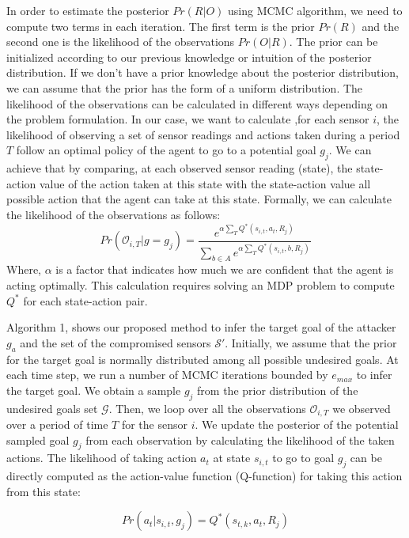 \documentclass[conference]{IEEEtran}
\begin{document}
In order to estimate the posterior $Pr(R|O)$ using  MCMC algorithm, we need to compute two terms in each iteration. The first term is the prior $Pr(R)$ and the second one is the likelihood of the observations $Pr(O|R)$.
The prior can be initialized according to our previous knowledge or intuition of the posterior distribution. If we don't have a prior knowledge about the posterior distribution, we can assume that the prior has the form of a uniform distribution.
The likelihood of the observations can be calculated in different ways depending on the problem formulation. In our case, we want to calculate ,for each sensor $i$, the likelihood of observing a set of sensor readings and actions taken during a period $T$ follow an optimal policy of the agent to go to a potential goal $g_j$. We can achieve that by comparing, at each observed sensor reading (state), the state-action value of the action taken at this state with the state-action value all possible action that the agent can take at this state. Formally, we can calculate the likelihood of the observations as follows:
\begin{equation}
Pr(\mathcal{O}_{i,T} | g = g_j)  = \frac{e^{\alpha\sum_{T}{Q^*(s_{i,t},a_t,R_j)}}}{\sum_{b\in A}{}e^{\alpha\sum_{T}{}Q^*(s_{i,t},b,R_j)}}
\label{eqn:3}
\end{equation}
Where, $\alpha$ is a factor that indicates how much we are confident that the agent is acting optimally. This calculation requires solving an MDP problem to compute $Q^*$ for each state-action pair. 

Algorithm 1, shows our proposed method to infer the target goal of the attacker $g_a$ and the set of the compromised sensors $\mathcal{S}'$. Initially, we assume that the prior for the target goal is normally distributed among all possible undesired goals. At each time step, we run a number of MCMC iterations bounded by ${e}_{max}$ to infer the target goal. We obtain a sample $g_j$ from the prior distribution of the undesired goals set $\mathcal{G}$. Then, we loop over all the observations $\mathcal{O}_{i,T}$ we observed over a period of time $T$ for the sensor $i$. We update the posterior of the potential sampled goal $g_j$ from each observation by calculating the likelihood of the taken actions. The likelihood of taking action $a_t$ at state $s_{i,t}$ to go to goal $g_j$ can be directly computed as the action-value function (Q-function) for taking this action from this state:

\begin{equation} Pr(a_t|s_{i,t},g_j) = Q^*(s_{t,k},a_t,R_j)
\label{eqn:action_likelihood}
\end{equation}
\end{document}
